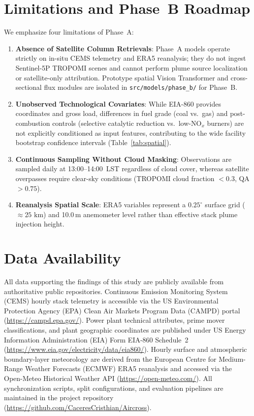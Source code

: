 \documentclass[conference]{IEEEtran}
\begin{document}


\section{Limitations and Phase~B Roadmap}
\label{sec:limitations}
We emphasize four limitations of Phase~A:
\begin{enumerate}
    \item \textbf{Absence of Satellite Column Retrievals}: Phase~A models operate strictly on in-situ CEMS telemetry and ERA5 reanalysis; they do not ingest Sentinel-5P TROPOMI scenes and cannot perform plume source localization or satellite-only attribution. Prototype spatial Vision Transformer and cross-sectional flux modules are isolated in \texttt{src/models/phase\_b/} for Phase~B.
    \item \textbf{Unobserved Technological Covariates}: While EIA-860 provides coordinates and gross load, differences in fuel grade (coal vs.\ gas) and post-combustion controls (selective catalytic reduction vs.\ low-$\text{NO}_x$ burners) are not explicitly conditioned as input features, contributing to the wide facility bootstrap confidence intervals (Table~\ref{tab:spatial}).
    \item \textbf{Continuous Sampling Without Cloud Masking}: Observations are sampled daily at 13:00--14:00~LST regardless of cloud cover, whereas satellite overpasses require clear-sky conditions (TROPOMI cloud fraction $< 0.3$, QA $> 0.75$).
    \item \textbf{Reanalysis Spatial Scale}: ERA5 variables represent a $0.25^\circ$ surface grid ($\approx 25\text{ km}$) and 10.0\,m anemometer level rather than effective stack plume injection height.
\end{enumerate}

\section{Data Availability}
\label{sec:data_availability}
All data supporting the findings of this study are publicly available from authoritative public repositories. Continuous Emission Monitoring System (CEMS) hourly stack telemetry is accessible via the US Environmental Protection Agency (EPA) Clean Air Markets Program Data (CAMPD) portal (\url{https://campd.epa.gov/}). Power plant technical attributes, prime mover classifications, and plant geographic coordinates are published under US Energy Information Administration (EIA) Form EIA-860 Schedule~2 (\url{https://www.eia.gov/electricity/data/eia860/}). Hourly surface and atmospheric boundary-layer meteorology are derived from the European Centre for Medium-Range Weather Forecasts (ECMWF) ERA5 reanalysis and accessed via the Open-Meteo Historical Weather API (\url{https://open-meteo.com/}). All synchronization scripts, split configurations, and evaluation pipelines are maintained in the project repository (\url{https://github.com/CaceresCristhian/Aircross}).
\end{document}
